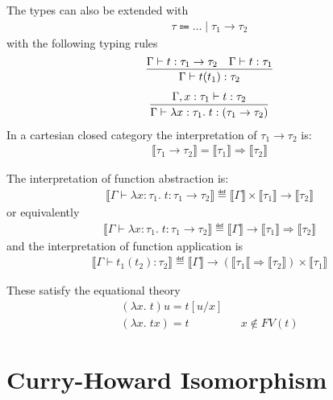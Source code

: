 The types can also be extended with 
\begin{align*}
    \tau \Coloneqq \ldots \mid \tau_1\rightarrow\tau_2
\end{align*}
with the following typing rules
\begin{align*}
    \infer{\Gamma\vdash t(t_1) : \tau_2}
    {\Gamma\vdash t : \tau_1 \rightarrow \tau_2 & \Gamma\vdash t : \tau_1}
\end{align*}
\begin{align*}
    \infer{\Gamma\vdash\lambda x:\tau_1 .\; t : (\tau_1 \rightarrow \tau_2)}
    {\Gamma, x:\tau_1\vdash t : \tau_2}
\end{align*}
In a cartesian closed category the interpretation of $\tau_1 \rightarrow \tau_2$
is:
\begin{align*}
    \llbracket\tau_1 \rightarrow \tau_2\rrbracket =
    \llbracket\tau_1\rrbracket\Rightarrow\llbracket\tau_2\rrbracket
\end{align*}

The interpretation of function abstraction is:
\begin{align*}
    \llbracket\Gamma\vdash\lambda x:\tau_1 .\; t :
    \tau_1\rightarrow\tau_2\rrbracket
    \eqdef
    \llbracket\Gamma\rrbracket
    \times
    \llbracket\tau_1\rrbracket
    \rightarrow
    \llbracket\tau_2\rrbracket
\end{align*}
or equivalently
\begin{align*}
    \llbracket\Gamma\vdash\lambda x:\tau_1 .\; t :
    \tau_1\rightarrow\tau_2\rrbracket
    \eqdef
    \llbracket\Gamma\rrbracket
    \rightarrow
    \llbracket\tau_1\rrbracket
    \Rightarrow
    \llbracket\tau_2\rrbracket
\end{align*}
and the interpretation of function application is
\begin{align*}
    \llbracket\Gamma\vdash t_1(t_2) : \tau_2\rrbracket
    \eqdef
    \llbracket\Gamma\rrbracket
    \rightarrow
    (\llbracket\tau_1\llbracket \Rightarrow \llbracket\tau_2\rrbracket)
    \times
    \llbracket\tau_1\rrbracket
\end{align*}

These satisfy the equational theory
\begin{align*}
    (\lambda x.\; t) u = t[u/x] \\
    (\lambda x.\; t x) = t  && x \not\in FV(t)
\end{align*}

\section{Curry-Howard Isomorphism}

